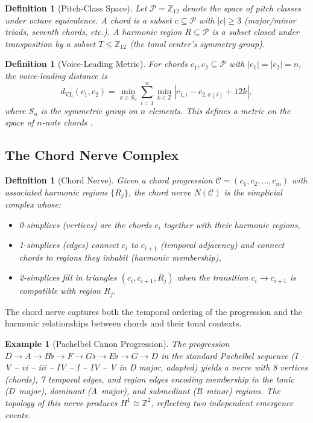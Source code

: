 \documentclass[12pt,a4paper]{article}
\newtheorem{definition}[theorem]{Definition}
\newtheorem{example}[theorem]{Example}
\newcommand{\ZZ}{\mathbb{Z}}
\newcommand{\Hone}{H^{1}}
\begin{document}
\begin{definition}[Pitch-Class Space]
  Let $\mathcal{P} = \ZZ_{12}$ denote the space of pitch classes under octave equivalence. 
  A \emph{chord} is a subset $c \subseteq \mathcal{P}$ with $|c| \geq 3$ (major/minor triads, 
  seventh chords, etc.). A \emph{harmonic region} $R \subseteq \mathcal{P}$ is a subset 
  closed under transposition by a subset $T \leq \ZZ_{12}$ (the tonal center's symmetry group).
\end{definition}

\begin{definition}[Voice-Leading Metric]
  For chords $c_1, c_2 \subseteq \mathcal{P}$ with $|c_1| = |c_2| = n$, the 
  \emph{voice-leading distance} is
  \[
    d_{\mathrm{VL}}(c_1, c_2) = \min_{\sigma \in S_n} \sum_{i=1}^{n} 
    \min_{k \in \ZZ} |c_{1,i} - c_{2,\sigma(i)} + 12k|,
  \]
  where $S_n$ is the symmetric group on $n$ elements. This defines a metric on the space 
  of $n$-note chords \cite{tymoczko2011}.
\end{definition}

\subsection{The Chord Nerve Complex}

\begin{definition}[Chord Nerve]
  Given a chord progression $\mathcal{C} = (c_1, c_2, \ldots, c_m)$ with associated 
  harmonic regions $\{R_j\}$, the \emph{chord nerve} $N(\mathcal{C})$ is the simplicial 
  complex whose:
  \begin{itemize}
    \item 0-simplices (vertices) are the chords $c_i$ together with their harmonic regions,
    \item 1-simplices (edges) connect $c_i$ to $c_{i+1}$ (temporal adjacency) and connect 
      chords to regions they inhabit (harmonic membership),
    \item 2-simplices fill in triangles $(c_i, c_{i+1}, R_j)$ when the transition 
      $c_i \to c_{i+1}$ is compatible with region $R_j$.
  \end{itemize}
\end{definition}

The chord nerve captures both the temporal ordering of the progression and the harmonic 
relationships between chords and their tonal contexts.

\begin{example}[Pachelbel Canon Progression]
  The progression $D \to A \to B\flat \to F \to G\flat \to E\flat \to G \to D$ in 
  the standard Pachelbel sequence (I -- V -- vi -- iii -- IV -- I -- IV -- V in D major, 
  adapted) yields a nerve with 8 vertices (chords), 7 temporal edges, and region edges 
  encoding membership in the tonic (D~major), dominant (A~major), and submediant 
  (B~minor) regions. The topology of this nerve produces $\Hone \cong \ZZ^{2}$, 
  reflecting two independent emergence events.
\end{example}
\end{document}
